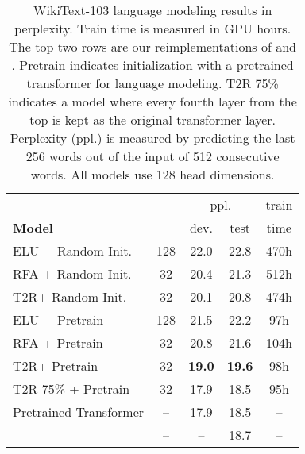 \documentclass[11pt,a4paper]{article}
\newcommand{\TRNN}{T2R\xspace}
\begin{document}
\begin{table}[h]
\centering
\addtolength{\tabcolsep}{-2.6pt}  
\begin{tabular}{@{} lcccc @{}}
\toprule
 & &  \multicolumn{2}{c}{ppl.} & train \\
\cmidrule(lr){3-4} \textbf{Model}&  &dev.  & test & time \\
\hline
ELU + Random Init. & 128 & 22.0 & 22.8 & 470h \\
RFA + Random Init. & 32 & 20.4 & 21.3 & 512h\\
\TRNN + Random Init. & 32 & 20.1 & 20.8 & 474h\\
\hdashline
ELU + Pretrain & 128  & 21.5 & 22.2 &97h \\
RFA + Pretrain & 32 & 20.8 & 21.6 & 104h \\
\TRNN + Pretrain & 32 & \textbf{19.0} & \textbf{19.6} & 98h \\
\hdashline
\TRNN 75\% + Pretrain & 32 & 17.9 &18.5  &  95h\\
\hline
Pretrained Transformer  & -- & 17.9 & 18.5 &  --\\

\citet{Baevski2019AdaptiveIR}  & -- & -- & 18.7 & --\\
\bottomrule
\end{tabular}
\caption{
WikiText-103 language modeling results in perplexity. Train time is measured in GPU hours. The top two rows are our reimplementations of \citet{katharopoulos-et-al-2020} and \citet{RFA}. Pretrain indicates initialization with a pretrained transformer for language modeling. \TRNN 75\% indicates a model where every fourth layer from the top is kept as the original transformer layer. Perplexity (ppl.) is measured by predicting the last 256 words out of the input of 512 consecutive words. All models use 128 head dimensions.}
\label{lm_results}
\end{table}
\end{document}
